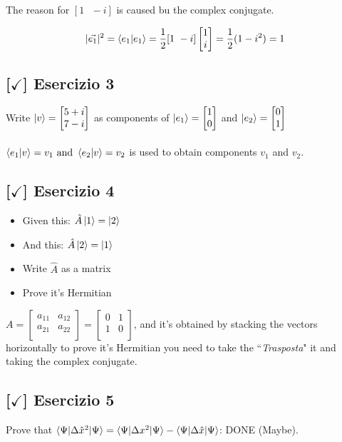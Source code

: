 The reason for $[1 \text{ } -i]$ is caused bu the complex conjugate.

$$|\vec{e_1}|^2 = \braket{e_1|e_1} = \frac{1}{2} [1 \text{ } -i] \begin{bmatrix} 1 \\ i \\ \end{bmatrix} = \frac{1}{2} (1-i^2) = 1$$

\subsection{[$\checkmark$] Esercizio 3}

Write $\ket{v} = \begin{bmatrix} 5+i \\ 7-i \\ \end{bmatrix}$ as components of $\ket{e_1} = \begin{bmatrix} 1 \\ 0 \\ \end{bmatrix}$ and $\ket{e_2} = \begin{bmatrix} 0 \\ 1 \\ \end{bmatrix}$
\\\\
$\braket{e_1|v} = v_1 \text{ and } \braket{e_2|v} = v_2$ is used to obtain components $v_1$ and $v_2$.

\subsection{[$\checkmark$] Esercizio 4}

\begin{itemize}
    \item Given this: $\hat{A}\ket{1} = \ket{2}$
    \item And this: $\hat{A}\ket{2} = \ket{1}$
    \item Write $\hat{A}$ as a matrix
    \item Prove it's Hermitian
\end{itemize}


$A = \begin{bmatrix} a_{11} & a_{12} \\ a_{21} & a_{22} \\ \end{bmatrix} = \begin{bmatrix} 0 & 1 \\ 1 & 0 \\ \end{bmatrix}$, and it's obtained by stacking the vectors horizontally to prove it's Hermitian you need to take the ``\textit{Trasposta}" it and taking the complex conjugate.


\subsection{[$\checkmark$] Esercizio 5}

Prove that $\braket{\Psi | \Delta \hat{x}^2 | \Psi} = \braket{\Psi | \Delta x^2 | \Psi} - \braket{\Psi | \Delta \hat{x} | \Psi}$: DONE (Maybe).